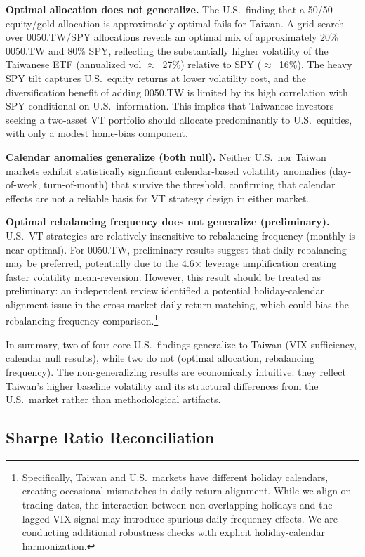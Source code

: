 \textbf{Optimal allocation does not generalize.} The U.S.\ finding that a 50/50 equity/gold allocation is approximately optimal fails for Taiwan. A grid search over 0050.TW/SPY allocations reveals an optimal mix of approximately 20\% 0050.TW and 80\% SPY, reflecting the substantially higher volatility of the Taiwanese ETF (annualized vol $\approx$~27\%) relative to SPY ($\approx$~16\%). The heavy SPY tilt captures U.S.\ equity returns at lower volatility cost, and the diversification benefit of adding 0050.TW is limited by its high correlation with SPY conditional on U.S.\ information. This implies that Taiwanese investors seeking a two-asset VT portfolio should allocate predominantly to U.S.\ equities, with only a modest home-bias component.

\textbf{Calendar anomalies generalize (both null).} Neither U.S.\ nor Taiwan markets exhibit statistically significant calendar-based volatility anomalies (day-of-week, turn-of-month) that survive the \citet{harvey2016} threshold, confirming that calendar effects are not a reliable basis for VT strategy design in either market.

\textbf{Optimal rebalancing frequency does not generalize (preliminary).} U.S.\ VT strategies are relatively insensitive to rebalancing frequency (monthly is near-optimal). For 0050.TW, preliminary results suggest that daily rebalancing may be preferred, potentially due to the 4.6$\times$ leverage amplification creating faster volatility mean-reversion. However, this result should be treated as preliminary: an independent review identified a potential holiday-calendar alignment issue in the cross-market daily return matching, which could bias the rebalancing frequency comparison.\footnote{Specifically, Taiwan and U.S.\ markets have different holiday calendars, creating occasional mismatches in daily return alignment. While we align on trading dates, the interaction between non-overlapping holidays and the lagged VIX signal may introduce spurious daily-frequency effects. We are conducting additional robustness checks with explicit holiday-calendar harmonization.}

In summary, two of four core U.S.\ findings generalize to Taiwan (VIX sufficiency, calendar null results), while two do not (optimal allocation, rebalancing frequency). The non-generalizing results are economically intuitive: they reflect Taiwan's higher baseline volatility and its structural differences from the U.S.\ market rather than methodological artifacts.

\subsection{Sharpe Ratio Reconciliation}

